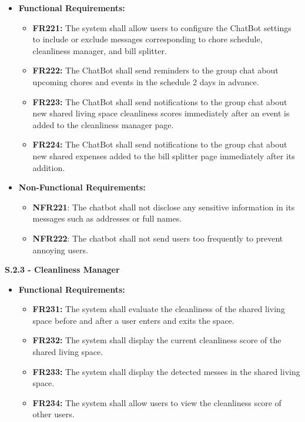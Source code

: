 \documentclass{scrreprt}
\theoremstyle{definition}
\begin{document}
\begin{flushleft}
  	\begin{itemize}
  		\item \textbf{Functional Requirements:}
  		\begin{itemize}
  			\item \textbf{FR221:} The system shall allow users to configure the ChatBot settings to include or exclude messages corresponding to chore schedule, cleanliness manager, and bill splitter.
            \item \textbf{FR222:} The ChatBot shall send reminders to the group chat about upcoming chores and events in the schedule 2 days in advance.
            \item \textbf{FR223:} The ChatBot shall send notifications to the group chat about new shared living space cleanliness scores immediately after an event is added to the cleanliness manager page.
            \item \textbf{FR224:} The ChatBot shall send notifications to the group chat about new shared expenses added to the bill splitter page immediately after its addition.
  		\end{itemize}
  		\item \textbf{Non-Functional Requirements:}
  		\begin{itemize}
  			\item \textbf{NFR221}: The chatbot shall not disclose any sensitive information in its messages such as addresses or full names.
  			\item \textbf{NFR222}: The chatbot shall not send users too frequently to prevent annoying users.
  		\end{itemize}
  	\end{itemize}
  	\item \textbf{S.2.3 - Cleanliness Manager}
  	\begin{itemize}
  		\item \textbf{Functional Requirements:}
  		\begin{itemize}
            \item \textbf{FR231:} The system shall evaluate the cleanliness of the shared living space before and after a user enters and exits the space.
  			\item \textbf{FR232:} The system shall display the current cleanliness score of the shared living space.
            \item \textbf{FR233:} The system shall display the detected messes in the shared living space.
            \item \textbf{FR234:} The system shall allow users to view the cleanliness score of other users.

\end{itemize}
\end{itemize}
\end{flushleft}
\end{document}
